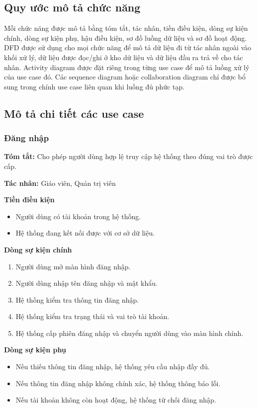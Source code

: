 \documentclass[12pt,a4paper]{article}
\begin{document}
\subsection{Quy ước mô tả chức năng}

Mỗi chức năng được mô tả bằng tóm tắt, tác nhân, tiền điều kiện, dòng sự kiện
chính, dòng sự kiện phụ, hậu điều kiện, sơ đồ luồng dữ liệu và sơ đồ hoạt động.
DFD được sử dụng cho mọi chức năng để mô tả dữ liệu đi từ tác nhân ngoài vào
khối xử lý, dữ liệu được đọc/ghi ở kho dữ liệu và dữ liệu đầu ra trả về cho tác
nhân. Activity diagram được đặt riêng trong từng use case để mô tả luồng xử lý
của use case đó. Các sequence diagram hoặc collaboration diagram chỉ được bổ
sung trong chính use case liên quan khi luồng đủ phức tạp.

\subsection{Mô tả chi tiết các use case}


\subsubsection{Đăng nhập}

\textbf{Tóm tắt:} Cho phép người dùng hợp lệ truy cập hệ thống theo đúng vai trò được cấp.

\textbf{Tác nhân:} Giáo viên, Quản trị viên

\textbf{Tiền điều kiện}
\begin{itemize}[leftmargin=*]
    \item Người dùng có tài khoản trong hệ thống.
    \item Hệ thống đang kết nối được với cơ sở dữ liệu.
\end{itemize}

\textbf{Dòng sự kiện chính}
\begin{enumerate}[leftmargin=*]
    \item Người dùng mở màn hình đăng nhập.
    \item Người dùng nhập tên đăng nhập và mật khẩu.
    \item Hệ thống kiểm tra thông tin đăng nhập.
    \item Hệ thống kiểm tra trạng thái và vai trò tài khoản.
    \item Hệ thống cấp phiên đăng nhập và chuyển người dùng vào màn hình chính.
\end{enumerate}

\textbf{Dòng sự kiện phụ}
\begin{itemize}[leftmargin=*]
    \item Nếu thiếu thông tin đăng nhập, hệ thống yêu cầu nhập đầy đủ.
    \item Nếu thông tin đăng nhập không chính xác, hệ thống thông báo lỗi.
    \item Nếu tài khoản không còn hoạt động, hệ thống từ chối đăng nhập.
\end{itemize}
\end{document}
